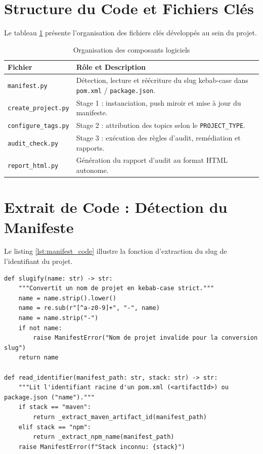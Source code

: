 \documentclass[12pt,a4paper]{report}
\begin{document}
\section{Structure du Code et Fichiers Clés}
Le tableau \ref{tab:structure_files} présente l'organisation des fichiers clés développés au sein du projet.

\begin{table}[htbp]
    \centering
    \caption{Organisation des composants logiciels}
    \label{tab:structure_files}
    \begin{tabular}{lp{10cm}}
        \toprule
        \textbf{Fichier} & \textbf{Rôle et Description} \\
        \midrule
        \texttt{manifest.py} & Détection, lecture et réécriture du slug kebab-case dans \texttt{pom.xml} / \texttt{package.json}. \\
        \texttt{create\_project.py} & Stage 1 : instanciation, push miroir et mise à jour du manifeste. \\
        \texttt{configure\_tags.py} & Stage 2 : attribution des topics selon le \texttt{PROJECT\_TYPE}. \\
        \texttt{audit\_check.py} & Stage 3 : exécution des règles d'audit, remédiation et rapports. \\
        \texttt{report\_html.py} & Génération du rapport d'audit au format HTML autonome. \\
        \bottomrule
    \end{tabular}
\end{table}

\section{Extrait de Code : Détection du Manifeste}
Le listing \ref{lst:manifest_code} illustre la fonction d'extraction du slug de l'identifiant du projet.

\begin{lstlisting}[style=PythonStyle, caption={Extrait de code du module manifest.py}, label={lst:manifest_code}]
def slugify(name: str) -> str:
    """Convertit un nom de projet en kebab-case strict."""
    name = name.strip().lower()
    name = re.sub(r"[^a-z0-9]+", "-", name)
    name = name.strip("-")
    if not name:
        raise ManifestError("Nom de projet invalide pour la conversion slug")
    return name

def read_identifier(manifest_path: str, stack: str) -> str:
    """Lit l'identifiant racine d'un pom.xml (<artifactId>) ou package.json ("name")."""
    if stack == "maven":
        return _extract_maven_artifact_id(manifest_path)
    elif stack == "npm":
        return _extract_npm_name(manifest_path)
    raise ManifestError(f"Stack inconnu: {stack}")
\end{lstlisting}
\end{document}
